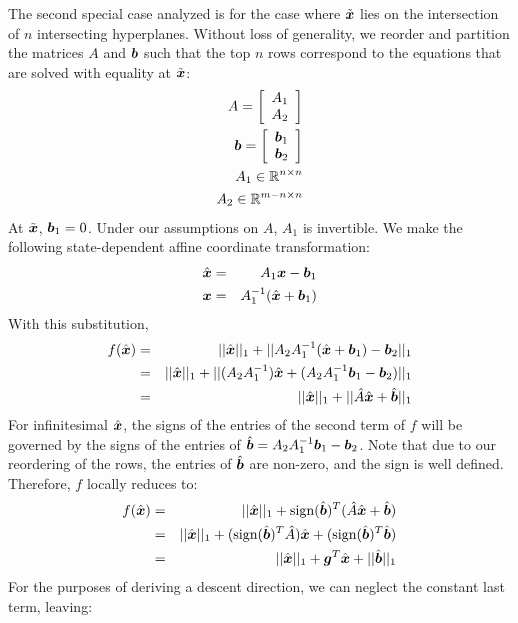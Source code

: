 \documentclass[9.5pt,journal,final,finalsubmission,twocolumn]{IEEEtran}
\begin{document}
The second special case analyzed is for the case where $\tilde{{\boldsymbol{x}}}$ lies on the intersection
of $n$ intersecting hyperplanes.  Without loss of generality, we reorder and partition the
matrices $A$ and $\boldsymbol{b}$ such that the top $n$ rows correspond to the equations that are solved
with equality at $\tilde{{\boldsymbol{x}}}$:
\begin{eqnarray}
A = \left[\begin{array}{c}A_1 \\ A_2 \end{array}\right]\\
\boldsymbol{b} = \left[\begin{array}{c}\boldsymbol{b}_1 \\ \boldsymbol{b}_2 \end{array}\right]\\
A_1 \in \mathbb R^{n \times n} \\
A_2 \in \mathbb R^{m-n \times n}
\end{eqnarray}
At $\tilde{{\boldsymbol{x}}}$, $\boldsymbol{b}_1 = 0$.  Under our assumptions on $A$, $A_1$ is invertible.
We make the following state-dependent affine coordinate transformation:
\begin{eqnarray}
\hat{{\boldsymbol{x}}} &=& A_1{\boldsymbol{x}} - \boldsymbol{b}_1 \\
{\boldsymbol{x}} &=& A_1^{-1} (\hat{{\boldsymbol{x}}} + \boldsymbol{b}_1)
\end{eqnarray}
With this substitution,
\begin{eqnarray}
f(\hat{{\boldsymbol{x}}}) &=& ||\hat{{\boldsymbol{x}}}||_1 + ||A_2 A_1^{-1} (\hat{{\boldsymbol{x}}} + \boldsymbol{b}_1) - \boldsymbol{b}_2 ||_1 \\
&=& ||\hat{{\boldsymbol{x}}}||_1 + || (A_2 A_1^{-1}) \hat{{\boldsymbol{x}}} + (A_2 A_1^{-1} \boldsymbol{b}_1 - \boldsymbol{b}_2) ||_1 \\
&=& ||\hat{{\boldsymbol{x}}}||_1 + || \hat A \hat{{\boldsymbol{x}}} + \hat {\boldsymbol{b}} ||_1
\end{eqnarray}
For infinitesimal $\hat{{\boldsymbol{x}}}$, the signs of the entries of the second term of $f$ will be
governed by the signs of the entries of $ \hat {\boldsymbol{b}} = A_2 A_1^{-1} \boldsymbol{b}_1 - \boldsymbol{b}_2$.  
Note that due to our reordering of the rows, the entries of $\hat {\boldsymbol{b}}$ are non-zero,
and the sign is well defined.
Therefore, $f$ locally reduces to:
\begin{eqnarray}
f(\hat{{\boldsymbol{x}}}) &=& ||\hat{{\boldsymbol{x}}}||_1 + {\text{sign}}(\hat {\boldsymbol{b}})^T(\hat A \hat {{\boldsymbol{x}}} + \hat {\boldsymbol{b}}) \\
&=& ||\hat{{\boldsymbol{x}}}||_1 + ({\text{sign}}(\hat {\boldsymbol{b}})^T \hat A) \hat {{\boldsymbol{x}}} + ({\text{sign}}(\hat {\boldsymbol{b}})^T  \hat {\boldsymbol{b}}) \\
&=& ||\hat{{\boldsymbol{x}}}||_1 + \boldsymbol{g}^T \hat {{\boldsymbol{x}}} + ||\hat {\boldsymbol{b}}||_1
\end{eqnarray}
For the purposes of deriving a descent direction, we can neglect the constant last term, leaving:
\end{document}
